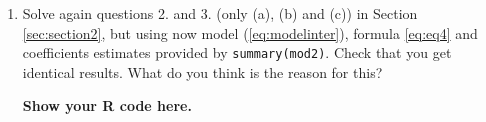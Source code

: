 \documentclass[a4paper,10pt]{article}\usepackage[]{graphicx}\usepackage[]{xcolor}
\begin{document}
\begin{enumerate}
    \begin{itemize}
        \item $\widehat{IRR}_{35-44} = 5.7366382$
        \item $\widehat{IRR}_{45-54} = 2.1388118$
        \item $\widehat{IRR}_{55-64} = 1.4682401$ 
        \item $\widehat{IRR}_{65-74} = 1.3560598$ 
        \item $\widehat{IRR}_{75-84} = 0.9047304$
    \end{itemize}

\item Solve again questions 2. and 3. (only (a), (b) and (c)) in Section \ref{sec:section2}, but using now model (\ref{eq:modelinter}), formula \ref{eq:eq4} and coefficients estimates provided by \texttt{summary(mod2)}. Check that you get identical results. What do you think is the reason for this? 


\textbf{Show your R code here.}


\end{enumerate}
\end{document}
